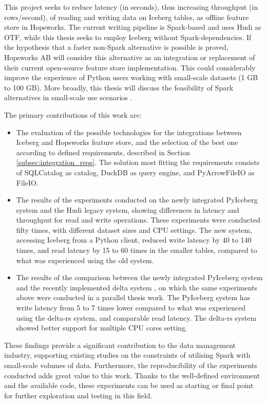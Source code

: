 This project seeks to reduce latency (in seconds), thus increasing throughput (in rows/second), of reading and writing data on Iceberg tables, as offline feature store in Hopsworks. The current writing pipeline is Spark-based and uses Hudi as \gls{OTF}, while this thesis seeks to employ Iceberg without Spark-dependencies. If the hypothesis that a faster non-Spark alternative is possible is proved, Hopsworks AB will consider this alternative as an integration or replacement of their current open-source feature store implementation. This could considerably improve the experience of Python users working with small-scale datasets (1 GB to 100 GB). More broadly, this thesis will discuss the feasibility of Spark alternatives in small-scale use scenarios \cite{manfrediReducingReadWrite2024}.


The primary contributions of this work are:
\begin{itemize}
    \item The evaluation of the possible technologies for the integrations between Iceberg and Hopsworks feature store, and the selection of the best one according to defined requirements, described in Section \ref{subsec:integration_reqs}. The solution most fitting the requirements consists of SQLCatalog as catalog, DuckDB as query engine, and PyArrowFileIO as FileIO.
    \item The results of the experiments conducted on the newly integrated PyIceberg system and the Hudi legacy system, showing differences in latency and throughput for read and write operations. These experiments were conducted fifty times, with different dataset sizes and \gls{CPU} settings. The new system, accessing Iceberg from a Python client, reduced write latency by 40 to 140 times, and read latency by 15 to 60 times in the smaller tables, compared to what was experienced using the old system.
    \item The results of the comparison between the newly integrated PyIceberg system and the recently implemented delta system \cite{manfrediReducingReadWrite2024}, on which the same experiments above were conducted in a parallel thesis work. The PyIceberg system has write latency from 5 to 7 times lower compared to what was experienced using the delta-rs system, and comparable read latency. The delta-rs system showed better support for multiple \gls{CPU} cores setting.
\end{itemize}

These findings provide a significant contribution to the data management industry, supporting existing studies on the constraints of utilising Spark with small-scale volumes of data. Furthermore, the reproducibility of the experiments conducted adds great value to this work. Thanks to the well-defined environment and the available code, these experiments can be used as starting or final point for further exploration and testing in this field. 